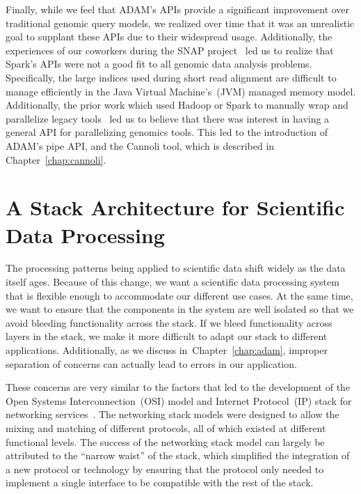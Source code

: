 \documentclass[phd]{ucbthesis}
\begin{document}
Finally, while we feel that {ADAM}'s APIs provide a significant
improvement over traditional genomic query models, we realized over time that it
was an unrealistic goal to supplant these APIs due to their widespread usage.
Additionally, the experiences of our coworkers during the {SNAP}
project~\cite{zaharia11} led us to realize that {Spark}'s APIs were not
a good fit to all genomic data analysis problems. Specifically, the large
indices used during short read alignment are difficult to manage efficiently in
the Java Virtual Machine's~(JVM) managed memory model. Additionally, the prior
work which used {Hadoop} or {Spark} to manually wrap and
parallelize legacy tools~\cite{schatz09, langmead09crossbow, abuin15, abuin16,
  chen15, chen16} led us to believe that there was interest in having a general
API for parallelizing genomics tools. This led to the introduction of ADAM's
{pipe} API, and the {Cannoli} tool, which is described in
Chapter~\ref{chap:cannoli}.

\section{A Stack Architecture for Scientific Data Processing}
\label{sec:stack-architecture}

The processing patterns being applied to scientific data shift widely as the data itself ages. Because of
this change, we want a scientific data processing system that is flexible enough to
accommodate our different use cases. At the same time, we want to ensure that the components in the
system are well isolated so that we avoid bleeding functionality across the stack. If we bleed functionality
across layers in the stack, we make it more difficult to adapt our stack to different applications.
Additionally, as we discuss in~Chapter~\ref{chap:adam}, improper separation of concerns can
actually lead to errors in our application.

These concerns are very similar to the factors that led to the development of the Open Systems
Interconnection~(OSI) model and Internet Protocol~(IP) stack for networking
services~\cite{zimmermann80}. The networking stack models were designed to allow the mixing and
matching of different protocols, all of which existed at different functional levels. The success of the
networking stack model can largely be attributed to the ``narrow waist'' of the stack, which simplified the
integration of a new protocol or technology by ensuring that the protocol only needed to implement a
single interface to be compatible with the rest of the stack.
\end{document}
